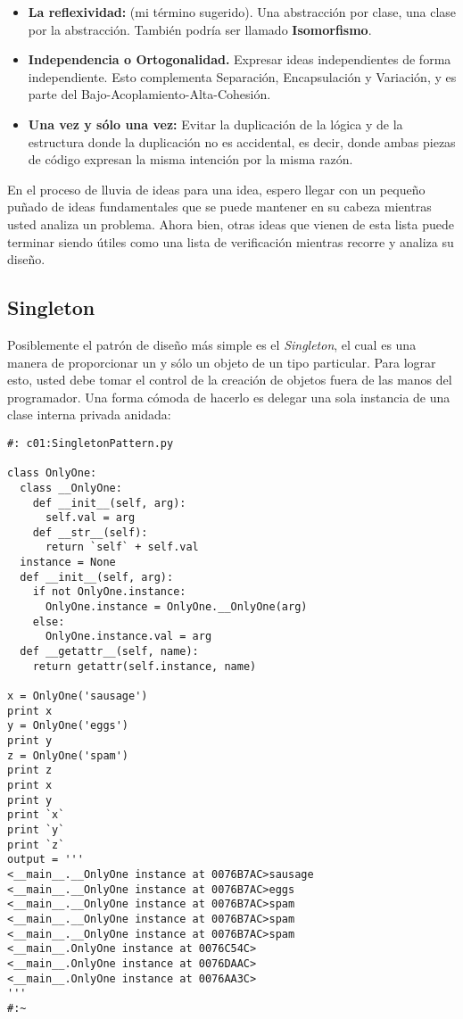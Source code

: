 \begin{itemize}
    \item \textbf{La reflexividad:} (mi término sugerido). Una abstracción por clase, una clase por la abstracción. También podría ser llamado \textbf{Isomorfismo}.
    
    \item \textbf{Independencia o Ortogonalidad.} Expresar ideas independientes de forma independiente. Esto complementa Separación, Encapsulación y Variación, y es parte del Bajo-Acoplamiento-Alta-Cohesión.
    
    \item \textbf{Una vez y sólo una vez:} Evitar la duplicación de la lógica y de la estructura donde la duplicación no es accidental, es decir, donde ambas piezas de código expresan la misma intención por la misma razón.

\end{itemize}

En el proceso de lluvia de ideas para una idea, espero llegar con un pequeño puñado de ideas fundamentales que se puede mantener en su cabeza mientras usted analiza un problema. Ahora bien, otras ideas que vienen de esta lista puede terminar siendo útiles como una lista de verificación mientras recorre y analiza su diseño.  \newline

\subsection*{Singleton}
\label{subsec:singl}

Posiblemente el patrón de diseño más simple es el \textit{Singleton}, 
el cual es una manera de proporcionar un y sólo un objeto de un tipo particular. Para lograr esto, usted debe tomar el control de la creación de objetos fuera de las manos del programador. Una forma cómoda de hacerlo es delegar una sola instancia de una clase interna privada anidada:    \newline %

 \begin{lstlisting}
#: c01:SingletonPattern.py 

class OnlyOne: 
  class __OnlyOne: 
    def __init__(self, arg): 
      self.val = arg 
    def __str__(self): 
      return `self` + self.val 
  instance = None 
  def __init__(self, arg): 
    if not OnlyOne.instance: 
      OnlyOne.instance = OnlyOne.__OnlyOne(arg) 
    else: 
      OnlyOne.instance.val = arg 
  def __getattr__(self, name): 
    return getattr(self.instance, name) 
    
x = OnlyOne('sausage') 
print x 
y = OnlyOne('eggs') 
print y 
z = OnlyOne('spam') 
print z 
print x 
print y 
print `x` 
print `y` 
print `z` 
output = ''' 
<__main__.__OnlyOne instance at 0076B7AC>sausage 
<__main__.__OnlyOne instance at 0076B7AC>eggs 
<__main__.__OnlyOne instance at 0076B7AC>spam 
<__main__.__OnlyOne instance at 0076B7AC>spam 
<__main__.__OnlyOne instance at 0076B7AC>spam 
<__main__.OnlyOne instance at 0076C54C> 
<__main__.OnlyOne instance at 0076DAAC> 
<__main__.OnlyOne instance at 0076AA3C> 
''' 
#:~ 
 \end{lstlisting}

